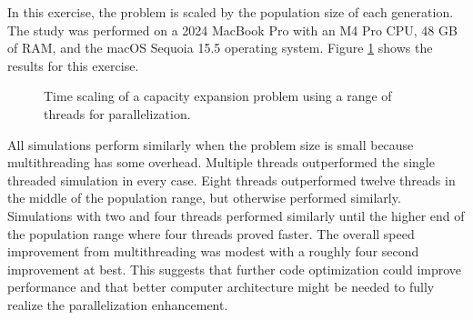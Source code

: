 \noindent In this exercise, the problem is scaled by the population size of each
generation. The study was performed on a 2024 MacBook Pro with an M4 Pro CPU, 
48 GB of RAM, and the macOS Sequoia 15.5 operating system. Figure
\ref{fig:thread-scaling} shows the results for this exercise.

\begin{figure}[htbp!]
    \centering
    \resizebox{0.75\columnwidth}{!}{}
    \caption{Time scaling of a capacity expansion problem using a range of
    threads for parallelization.}
    \label{fig:thread-scaling}
\end{figure}

All simulations perform similarly when the problem size is small
because multithreading has some overhead. Multiple threads outperformed the
single threaded simulation in every case. Eight threads outperformed twelve
threads in the middle of the population range, but otherwise performed
similarly. Simulations with two and four threads performed similarly until the
higher end of the population range where four threads proved faster. The overall
speed improvement from multithreading was modest with a roughly four second
improvement at best. This suggests that further code optimization could improve
performance and that better computer architecture might be needed to fully
realize the parallelization enhancement.

\FloatBarrier